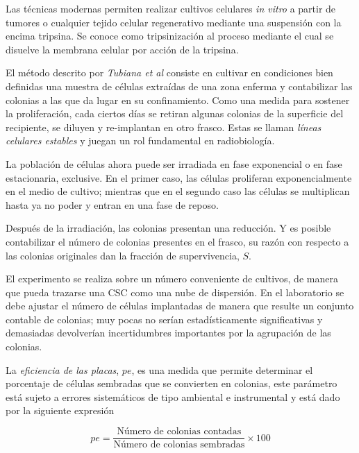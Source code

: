 \documentclass[12pt,letterpaper, oneside]{book}
\begin{document}
				Las técnicas modernas permiten realizar cultivos celulares \textit{in vitro} a partir de tumores o cualquier tejido celular regenerativo  mediante una suspensión con la encima tripsina\cite{Hall.2000}. Se conoce como tripsinización al proceso mediante el cual se disuelve la membrana celular por acción de la tripsina\cite{Tubiana.1990, Hall.2000}. 
			
				El método descrito por \textit{Tubiana et al} consiste en cultivar en condiciones bien definidas una muestra de células extraídas de una zona enferma y contabilizar las colonias a las que da lugar en su confinamiento. Como una medida para sostener la proliferación, cada ciertos días se retiran algunas colonias de la superficie del recipiente, se diluyen y re-implantan en otro frasco. Estas se llaman \textit{líneas celulares estables} y juegan un rol fundamental en radiobiología\cite{Hall.2000}.
			
				La población de células ahora puede ser irradiada en fase exponencial o en fase estacionaria, exclusive. En el primer caso, las células proliferan exponencialmente en el medio de cultivo; mientras que en el segundo caso las células se multiplican hasta ya no poder y entran en una fase de reposo\cite{Tubiana.1990}. 
			
				Después de la irradiación, las colonias presentan una reducción. Y es posible contabilizar el número de colonias presentes en el frasco, su razón con respecto a las colonias originales dan la fracción de supervivencia, $S$\cite{Tubiana.1990, Hall.2000}. 
			
				El experimento se realiza sobre un número conveniente de cultivos, de manera que pueda trazarse una CSC como una nube de dispersión\cite{Tubiana.1990, Hall.2000}. En el laboratorio se debe ajustar el número de células implantadas de manera que resulte un conjunto contable de colonias; muy pocas no serían estadísticamente significativas y demasiadas devolverían incertidumbres importantes por la agrupación de las colonias\cite{Hall.2000}.
				
				La \textit{eficiencia de las placas}, $pe$, es una medida que permite determinar el porcentaje de células sembradas que se convierten en colonias, este parámetro está sujeto a errores sistemáticos de tipo ambiental e instrumental\cite{Hall.2000} y está dado por la siguiente expresión
				
				\begin{equation}
					pe=\frac{\textrm{Número de colonias contadas}}{\textrm{Número de colonias sembradas}}\times 100
				\end{equation}
				
\end{document}
